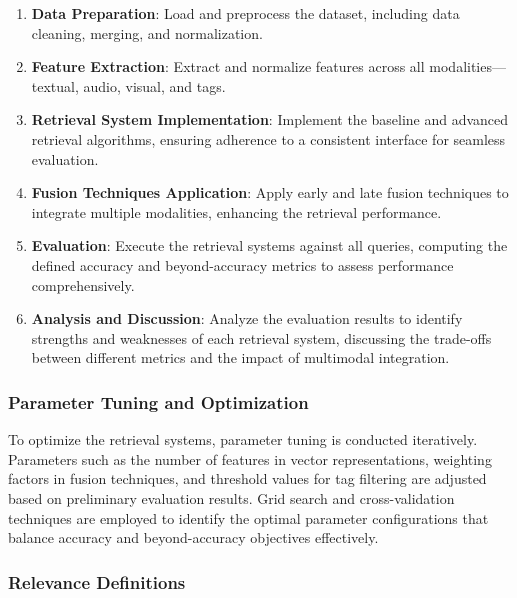 \documentclass[sigconf]{acmart}
\begin{document}
\begin{enumerate}
    \item \textbf{Data Preparation}: Load and preprocess the dataset, including data cleaning, merging, and normalization.
    
    \item \textbf{Feature Extraction}: Extract and normalize features across all modalities—textual, audio, visual, and tags.
    
    \item \textbf{Retrieval System Implementation}: Implement the baseline and advanced retrieval algorithms, ensuring adherence to a consistent interface for seamless evaluation.
    
    \item \textbf{Fusion Techniques Application}: Apply early and late fusion techniques to integrate multiple modalities, enhancing the retrieval performance.
    
    \item \textbf{Evaluation}: Execute the retrieval systems against all queries, computing the defined accuracy and beyond-accuracy metrics to assess performance comprehensively.
    
    \item \textbf{Analysis and Discussion}: Analyze the evaluation results to identify strengths and weaknesses of each retrieval system, discussing the trade-offs between different metrics and the impact of multimodal integration.
\end{enumerate}

\subsubsection{Parameter Tuning and Optimization}

To optimize the retrieval systems, parameter tuning is conducted iteratively. Parameters such as the number of features in vector representations, weighting factors in fusion techniques, and threshold values for tag filtering are adjusted based on preliminary evaluation results. Grid search and cross-validation techniques are employed to identify the optimal parameter configurations that balance accuracy and beyond-accuracy objectives effectively.

\subsubsection{Relevance Definitions}
\end{document}
